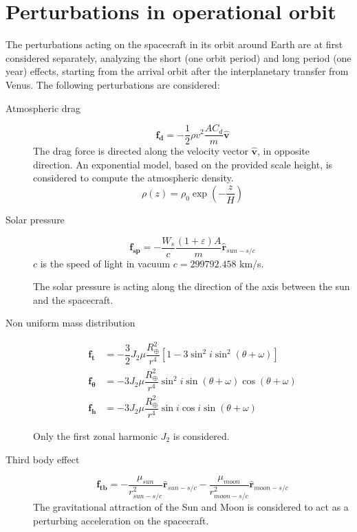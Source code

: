 \section{Perturbations in operational orbit}
The perturbations acting on the spacecraft in its orbit around Earth are at first considered separately, analyzing the short (one orbit period) and long period (one year) effects, starting from the arrival orbit after the interplanetary transfer from Venus.
The following perturbations are considered:
\begin{description}
\item [Atmospheric drag]
\begin{equation}
\mathbf{f_d}=-\dfrac{1}{2} \rho v^2 \dfrac{A C_d}{m} \mathbf{\hat v}
\end{equation}
The drag force is directed along the velocity vector $\mathbf {\hat v}$, in opposite direction.
An exponential model, based on the provided scale height, is considered to compute the atmospheric density.
\[
\rho(z)=\rho_0 \exp{\left (-\dfrac{z}{H}\right )}
\]
\item[Solar pressure]
\begin{equation}
\mathbf{f_{sp}} = -\dfrac{W_s}{c} \dfrac{(1+\varepsilon) A}{m} \mathbf{\hat r}_{sun-s/c}
\end{equation}
$c$ is the speed of light in vacuum $c=299792.458$ km/s.

The solar pressure is acting along the direction of the axis between the sun and the spacecraft.

\item[Non uniform mass distribution]

\begin{align}
\mathbf{f_t}&=-\dfrac{3}{2} J_2 \mu \dfrac{R_{\oplus}^2}{r^4} [ 1 - 3\sin^2i\sin^2(\theta+\omega)]\\
\mathbf{f_{\theta}}&=-3 J_2 \mu \dfrac{R_{\oplus}^2}{r^4}\sin^2i\sin(\theta+\omega)\cos(\theta+\omega)\\
\mathbf{f_h}&=-3 J_2 \mu \dfrac{R_{\oplus}^2}{r^4}\sin i \cos i \sin(\theta+\omega)
\end{align}

Only the first zonal harmonic $J_2$ is considered.
\item[Third body effect]
\begin{equation}
\mathbf{f_{tb}}=-\dfrac{\mu_{sun}}{r_{sun-s/c}^2}\mathbf{\hat r}_{sun-s/c}-\dfrac{\mu_{moon}}{r_{moon-s/c}^2}\mathbf{\hat r}_{moon-s/c}
\end{equation}
The gravitational attraction of the Sun and Moon is considered to act as a perturbing acceleration on the spacecraft. 
\end{description}

